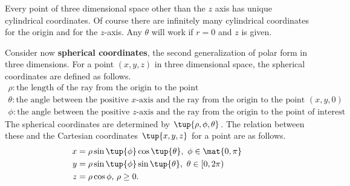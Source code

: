 \begin{center}
\end{center}

 Every point of three dimensional
space other than the $z$ axis  has  unique cylindrical coordinates. Of course there are infinitely many cylindrical coordinates for the
origin and for the $z$-axis. Any $\theta $ will work if $r=0$ and $z$ is given.  

Consider now \textbf{spherical coordinates}, the second generalization of polar form in three dimensions. For a point $(x,y,z)$ in three dimensional space, the spherical coordinates are defined as follows.
\begin{equation*}
\begin{array}{l}
\rho: \mbox{the length of the ray from the origin to the point}\\
\theta: \mbox{the angle between the positive $x$-axis and the ray from the origin to the point $(x,y,0)$}\\
\phi: \mbox{the angle between the positive $z$-axis and the ray from the origin to the point of interest}
\end{array}
\end{equation*}
The spherical coordinates are determined by $\tup{\rho ,\phi
,\theta } $. The relation between these and the Cartesian coordinates $\tup{x,y,z }$ for a point
are as follows.  
\begin{align*}
x& =\rho \sin \tup{\phi } \cos \tup{\theta } ,\ \phi \in 
\mat{0,\pi}  \\
y& =\rho \sin \tup{\phi } \sin \tup{\theta } ,\text{ }\theta
\in \lbrack 0,2\pi ) \\
z& =\rho \cos \phi \text{, }\rho \geq 0.
\end{align*}

